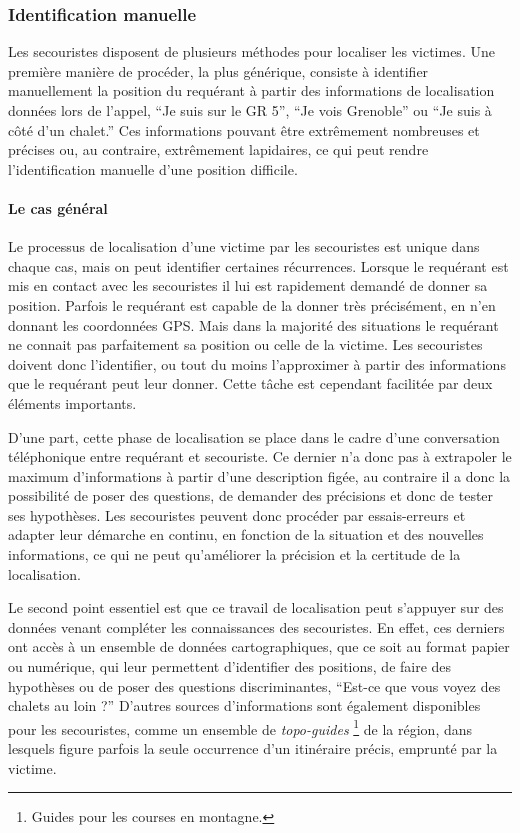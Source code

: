\subsubsection{Identification manuelle}
\label{subsec:1-1-2-1}

Les secouristes disposent de plusieurs méthodes pour localiser les
victimes. Une première manière de procéder, la plus générique,
consiste à identifier manuellement la position du requérant à partir
des informations de localisation données lors de l'appel, \eg
\enquote{Je suis sur le GR 5}, \enquote{Je vois Grenoble} ou
\enquote{Je suis à côté d'un chalet.} Ces informations pouvant être
extrêmement nombreuses et précises ou, au contraire, extrêmement
lapidaires, ce qui peut rendre l'identification manuelle d'une
position difficile.

\paragraph{Le cas général}

Le processus de localisation d'une victime par les secouristes est
unique dans chaque cas, mais on peut identifier certaines
récurrences. Lorsque le requérant est mis en contact avec les
secouristes il lui est rapidement demandé de donner sa
position. Parfois le requérant est capable de la donner très
précisément, \eg en n'en donnant les coordonnées GPS. Mais dans la
majorité des situations le requérant ne connait pas parfaitement sa
position ou celle de la victime. Les secouristes doivent donc
l'identifier, ou tout du moins l'approximer à partir des informations
que le requérant peut leur donner. Cette tâche est cependant facilitée
par deux éléments importants.

D'une part, cette phase de localisation se place dans le cadre d'une
conversation téléphonique entre requérant et secouriste. Ce dernier
n'a donc pas à extrapoler le maximum d'informations à partir d'une
description figée, au contraire il a donc la possibilité de poser des
questions, de demander des précisions et donc de tester ses
hypothèses. Les secouristes peuvent donc procéder par essais-erreurs
et adapter leur démarche en continu, en fonction de la situation et
des nouvelles informations, ce qui ne peut qu'améliorer la précision
et la certitude de la localisation.

Le second point essentiel est que ce travail de localisation peut
s'appuyer sur des données venant compléter les connaissances des
secouristes. En effet, ces derniers ont accès à un ensemble de données
cartographiques, que ce soit au format papier ou numérique, qui leur
permettent d'identifier des positions, de faire des hypothèses ou de
poser des questions discriminantes, \eg \enquote{Est-ce que vous voyez
  des chalets au loin ?} D'autres sources d'informations sont
également disponibles pour les secouristes, comme un ensemble de
\emph{topo-guides} \footnote{Guides pour les courses en montagne.} de
la région, dans lesquels figure parfois la seule occurrence d'un
itinéraire précis, emprunté par la victime. 

